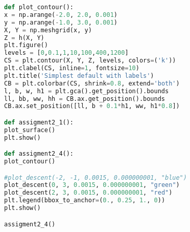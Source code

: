 \documentclass{article}
\begin{document}
\begin{lstlisting}[language=python]
def plot_contour():
x = np.arange(-2.0, 2.0, 0.001)
y = np.arange(-1.0, 3.0, 0.001)
X, Y = np.meshgrid(x, y)
Z = h(X, Y)
plt.figure()
levels = [0,0.1,1,10,100,400,1200]
CS = plt.contour(X, Y, Z, levels, colors=('k'))
plt.clabel(CS, inline=1, fontsize=10)
plt.title('Simplest default with labels')
CB = plt.colorbar(CS, shrink=0.8, extend='both')
l, b, w, h1 = plt.gca().get_position().bounds
ll, bb, ww, hh = CB.ax.get_position().bounds
CB.ax.set_position([ll, b + 0.1*h1, ww, h1*0.8])

def assigment2_1():
plot_surface()
plt.show()

def assigment2_4():
plot_contour()

#plot_descent(-2, -1, 0.0015, 0.000000001, "blue")
plot_descent(0, 3, 0.0015, 0.000000001, "green")
plot_descent(2, 3, 0.0015, 0.000000001, "red")
plt.legend(bbox_to_anchor=(0., 0.25, 1., 0))
plt.show()

assigment2_4()

\end{lstlisting}
\end{document}
